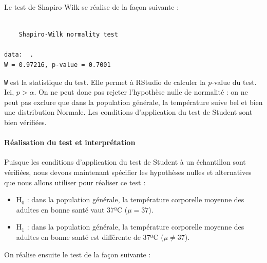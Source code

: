 \documentclass[
  a4paper,
]{article}
\newenvironment{Shaded}{\begin{snugshade}}{\end{snugshade}}
\newcommand{\DataTypeTok}[1]{\textcolor[rgb]{0.00,0.34,0.68}{#1}}
\newcommand{\DecValTok}[1]{\textcolor[rgb]{0.69,0.50,0.00}{#1}}
\newcommand{\KeywordTok}[1]{\textcolor[rgb]{0.12,0.11,0.11}{\textbf{#1}}}
\newcommand{\NormalTok}[1]{\textcolor[rgb]{0.12,0.11,0.11}{#1}}
\newcommand{\OperatorTok}[1]{\textcolor[rgb]{0.12,0.11,0.11}{#1}}
\newcommand{\StringTok}[1]{\textcolor[rgb]{0.75,0.01,0.01}{#1}}
\providecommand{\tightlist}{%
  \setlength{\itemsep}{0pt}\setlength{\parskip}{0pt}}
\begin{document}
Le test de Shapiro-Wilk se réalise de la façon suivante :

\begin{Shaded}
\end{Shaded}

\begin{verbatim}

    Shapiro-Wilk normality test

data:  .
W = 0.97216, p-value = 0.7001
\end{verbatim}

\texttt{W} est la statistique du test. Elle permet à RStudio de calculer la \emph{p}-value du test. Ici, \(p > \alpha\). On ne peut donc pas rejeter l'hypothèse nulle de normalité : on ne peut pas exclure que dans la population générale, la température suive bel et bien une distribution Normale. Les conditions d'application du test de Student sont bien vérifiées.

\hypertarget{ruxe9alisation-du-test-et-interpruxe9tation}{%
\paragraph{Réalisation du test et interprétation}\label{ruxe9alisation-du-test-et-interpruxe9tation}}

Puisque les conditions d'application du test de Student à un échantillon sont vérifiées, nous devons maintenant spécifier les hypothèses nulles et alternatives que nous allons utiliser pour réaliser ce test :

\begin{itemize}
\tightlist
\item
  H\(_0\) : dans la population générale, la température corporelle moyenne des adultes en bonne santé vaut 37ºC (\(\mu = 37\)).
\item
  H\(_1\) : dans la population générale, la température corporelle moyenne des adultes en bonne santé est différente de 37ºC (\(\mu \neq 37\)).
\end{itemize}

On réalise ensuite le test de la façon suivante :

\begin{Shaded}
\end{Shaded}
\end{document}
